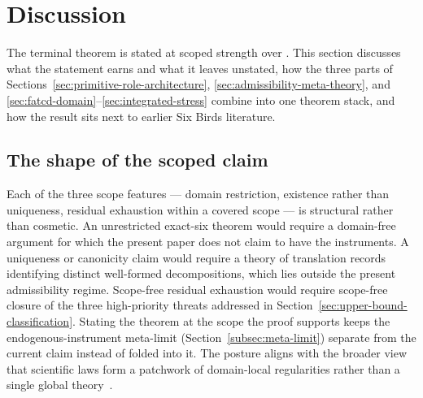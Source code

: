 \section{Discussion}\label{sec:discussion}

%
%

The terminal theorem is stated at scoped strength over \FATCD{}.
This section discusses what the statement earns and what it leaves
unstated, how the three parts of
Sections~\ref{sec:primitive-role-architecture},
\ref{sec:admissibility-meta-theory}, and
\ref{sec:fatcd-domain}--\ref{sec:integrated-stress} combine into one
theorem stack, and how the result sits next to earlier Six Birds
literature.

\subsection{The shape of the scoped claim}\label{subsec:discussion-shape}

Each of the three scope features --- domain restriction, existence
rather than uniqueness, residual exhaustion within a covered scope
--- is structural rather than cosmetic. An unrestricted exact-six
theorem would require a domain-free argument for which the present
paper does not claim to have the instruments. A uniqueness or
canonicity claim would require a theory of translation records
identifying distinct well-formed decompositions, which lies outside
the present admissibility regime. Scope-free residual exhaustion
would require scope-free closure of the three high-priority threats
addressed in Section~\ref{sec:upper-bound-classification}. Stating
the theorem at the scope the proof supports keeps the
endogenous-instrument meta-limit (Section~\ref{subsec:meta-limit})
separate from the current claim instead of folded into it. The posture
aligns with the broader view that scientific laws form a patchwork of
domain-local regularities rather than a single global
theory~\citep{Cartwright1999}.

